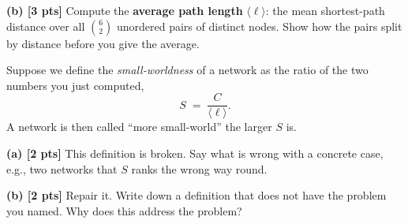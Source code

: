 \documentclass[a4paper, 12pt]{extarticle}
\begin{document}
\vspace{0.1em}

\textbf{(b) [3 pts]} Compute the \textbf{average path length} $\langle \ell
\rangle$: the mean shortest-path distance over all $\binom{6}{2}$ unordered
pairs of distinct nodes. Show how the pairs split by distance before you give
the average.


Suppose we define the \emph{small-worldness} of a network as the ratio of the
two numbers you just computed,
\[
  S \;=\; \frac{C}{\langle \ell \rangle}.
\]
A network is then called ``more small-world'' the larger $S$ is.

\vspace{0.2em}

\textbf{(a) [2 pts]} This definition is broken. Say what is wrong with a concrete case, e.g., two networks that $S$ ranks the wrong
way round.

\vspace{0.2em}

\textbf{(b) [2 pts]} Repair it. Write down a definition that does not have the
problem you named. Why does this address the problem?

\vfill
\end{document}
